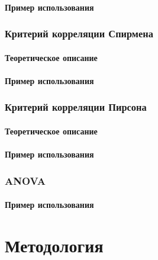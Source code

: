 \documentclass[12pt]{article}
\begin{document}
\paragraph{Пример использования}
\vspace{0.5em}

\subsubsection{Критерий корреляции Спирмена}

\paragraph{Теоретическое описание}
\vspace{0.5em}

\paragraph{Пример использования}
\vspace{0.5em}

\subsubsection{Критерий корреляции Пирсона}

\paragraph{Теоретическое описание}
\vspace{0.5em}

\paragraph{Пример использования}
\vspace{0.5em}

\subsubsection{ANOVA}
\vspace{0.5em}

\paragraph{Пример использования}
\vspace{0.5em}

\newpage
\section{Методология}
\end{document}
